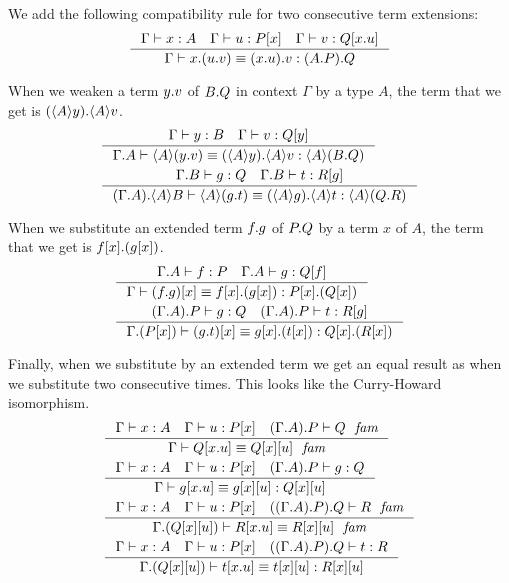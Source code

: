 We add the following compatibility rule for two consecutive term extensions:
\begin{equation}
\inference{\jterm{\Gamma}{A}{x}\quad\jterm{\Gamma}{\subst{x}{P}}{u}\quad\jterm{\Gamma}{\subst{\ctxext{x}{u}}{Q}}{v}}
{\jtermeq{\Gamma}{\ctxext{{A}{P}}{Q}}{\ctxext{x}{{u}{v}}}{\ctxext{{x}{u}}{v}}}
\end{equation}

When we weaken a term $\ctxext{y}{v}$ of $\ctxext{B}{Q}$ in context $\Gamma$ by
a type $A$, the term that we get is $\ctxext{\ctxwk{A}{y}}{\ctxwk{A}{v}}$.
\begin{align}
& \inference{\jterm{\Gamma}{B}{y}\quad\jterm{\Gamma}{\subst{y}{Q}}{v}}{\jtermeq{\ctxext{\Gamma}{A}}{\ctxwk{A}{\ctxext{B}{Q}}}{\ctxwk{A}{\ctxext{y}{v}}}{\ctxext{\ctxwk{A}{y}}{\ctxwk{A}{v}}}}\\
& \inference{\jterm{\ctxext{\Gamma}{B}}{Q}{g}\quad\jterm{\ctxext{\Gamma}{B}}{\subst{g}{R}}{t}}{\jtermeq{\ctxext{{\Gamma}{A}}{\ctxwk{A}{B}}}{\ctxwk{A}{\ctxext{Q}{R}}}{\ctxwk{A}{\ctxext{g}{t}}}{\ctxext{\ctxwk{A}{g}}{\ctxwk{A}{t}}}}
\end{align}

When we substitute an extended term $\ctxext{f}{g}$ of $\ctxext{P}{Q}$ by a term
$x$ of $A$, the term that we get is $\ctxext{\subst{x}{f}}{\subst{x}{g}}$.
\begin{align}
& \inference{\jterm{\ctxext{\Gamma}{A}}{P}{f}\quad\jterm{\ctxext{\Gamma}{A}}{\subst{f}{Q}}{g}}{\jtermeq{\Gamma}{\ctxext{\subst{x}{P}}{\subst{x}{Q}}}{\subst{x}{\ctxext{f}{g}}}{\ctxext{\subst{x}{f}}{\subst{x}{g}}}}\\
& \inference{\jterm{\ctxext{{\Gamma}{A}}{P}}{Q}{g}\quad\jterm{\ctxext{{\Gamma}{A}}{P}}{\subst{g}{R}}{t}}{\jtermeq{\ctxext{\Gamma}{\subst{x}{P}}}{\ctxext{\subst{x}{Q}}{\subst{x}{R}}}{\subst{x}{\ctxext{g}{t}}}{\ctxext{\subst{x}{g}}{\subst{x}{t}}}}
\end{align}

Finally, when we substitute by an extended term we get an equal result as when we
substitute two consecutive times. This looks like the Curry-Howard isomorphism.
\begin{align}
& \inference{\jterm{\Gamma}{A}{x}\quad\jterm{\Gamma}{\subst{x}{P}}{u}\quad\jfam{\ctxext{{\Gamma}{A}}{P}}{Q}}
  {\jfameq{\Gamma}{\subst{\ctxext{x}{u}}{Q}}{\subst{u}{{x}{Q}}}}\\
& \inference{\jterm{\Gamma}{A}{x}\quad\jterm{\Gamma}{\subst{x}{P}}{u}\quad\jterm{\ctxext{{\Gamma}{A}}{P}}{Q}{g}}
  {\jtermeq{\Gamma}{\subst{u}{{x}{Q}}}{\subst{\ctxext{x}{u}}{g}}{\subst{u}{{x}{g}}}}\\
& \inference{\jterm{\Gamma}{A}{x}\quad\jterm{\Gamma}{\subst{x}{P}}{u}\quad\jfam{\ctxext{{{\Gamma}{A}}{P}}{Q}}{R}}
  {\jfameq{\ctxext{\Gamma}{\subst{u}{{x}{Q}}}}{\subst{\ctxext{x}{u}}{R}}{\subst{u}{{x}{R}}}}\\
& \inference{\jterm{\Gamma}{A}{x}\quad\jterm{\Gamma}{\subst{x}{P}}{u}\quad\jterm{\ctxext{{{\Gamma}{A}}{P}}{Q}}{R}{t}}
  {\jtermeq{\ctxext{\Gamma}{\subst{u}{{x}{Q}}}}{\subst{u}{{x}{R}}}{\subst{\ctxext{x}{u}}{t}}{\subst{u}{{x}{t}}}}
\end{align}

